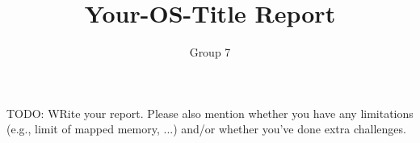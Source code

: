 \documentclass[10pt,a4paper,titlepage]{report}
\title{Your-OS-Title Report}
\author{Group 7}
\begin{document}
	
	\maketitle
	
	TODO: WRite your report. Please also mention whether you have any limitations
	(e.g., limit of mapped memory, ...) and/or whether you've done extra challenges.
	
	
	
	
	
	
	
	

		
	 
	
	
	
	
\end{document}
